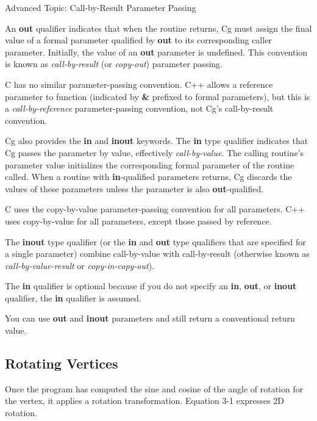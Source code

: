 \documentclass[../main.tex]{subfiles}
\begin{document}
\begin{framed}
Advanced Topic: Call-by-Result Parameter Passing

An \textbf{out} qualifier indicates that when the routine returns, Cg must assign the final value of a formal parameter qualified by \textbf{out} to its corresponding caller parameter. Initially, the value of an \textbf{out} parameter is undefined. This convention is known as \textit{call-by-result} (or \textit{copy-out}) parameter passing.

C has no similar parameter-passing convention. C++ allows a reference parameter to function (indicated by \textbf{\&} prefixed to formal parameters), but this is a \textit{call-by-reference} parameter-passing convention, not Cg's call-by-result convention.

Cg also provides the \textbf{in} and \textbf{inout} keywords. The \textbf{in} type qualifier indicates that Cg passes the parameter by value, effectively \textit{call-by-value}. The calling routine's parameter value initializes the corresponding formal parameter of the routine called. When a routine with \textbf{in}-qualified parameters returns, Cg discards the values of these parameters unless the parameter is also \textbf{out}-qualified.

C uses the copy-by-value parameter-passing convention for all parameters. C++ uses copy-by-value for all parameters, except those passed by reference.

The \textbf{inout} type qualifier (or the \textbf{in} and \textbf{out} type qualifiers that are specified for a single parameter) combine call-by-value with call-by-result (otherwise known as \textit{call-by-value-result} or \textit{copy-in-copy-out}).

The \textbf{in} qualifier is optional because if you do not specify an \textbf{in}, \textbf{out}, or \textbf{inout} qualifier, the \textbf{in} qualifier is assumed.

You can use \textbf{out} and \textbf{inout} parameters and still return a conventional return value.
\end{framed}

\subsection*{Rotating Vertices}

Once the program has computed the sine and cosine of the angle of rotation for the vertex, it applies a rotation transformation. Equation 3-1 expresses 2D rotation.
\end{document}
